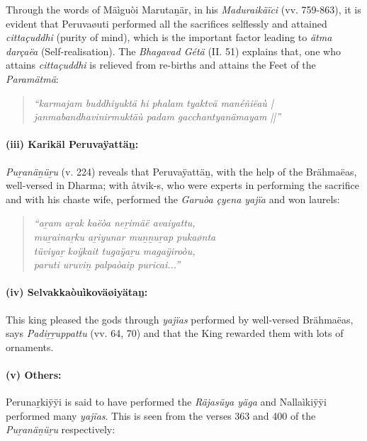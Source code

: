Through the words of Mäìguòi Marutaṉär, in his \textit{Maduraikäïci} (vv. 759-863), it is evident that Peruvaøuti performed all the sacrifices selflessly and attained \textit{cittaçuddhi} (purity of mind), which is the important factor leading to \textit{ätma darçaëa} (Self-realisation). The \textit{Bhagavad Gétä} (II. 51) explains that, one who attains \textit{cittaçuddhi} is relieved from re-births and attains the Feet of the \textit{Paramätmä}:

\begin{verse}
\textit{“karmajam buddhiyuktä hi phalam tyaktvä manéñiëaù |}\\\textit{janmabandhavinirmuktäù padam gacchantyanämayam ||”}
\end{verse}


\paragraph*{(iii) Karikäl Peruvaÿattäṉ:}

\textit{Puṟanäṉüṟu} (v. 224) reveals that Peruvaÿattäṉ, with the help of the Brähmaëas, well-versed in Dharma; with åtvik-s, who were experts in performing the sacrifice and with his chaste wife, performed the \textit{Garuòa çyena yajïa} and won laurels:

\begin{verse}
\textit{“aṟam aṟak kaëòa neṟimäë avaiyattu,}\\\textit{muṟainaṟku aṟiyunar muṉṉuṟap pukaønta}\\\textit{tüviyaṟ koÿkait tugaÿaṟu magaÿiroòu,}\\\textit{paruti uruviṉ palpaòaip puricai...”}
\end{verse}


\paragraph*{(iv) Selvakkaòuìkoväøiyätaṉ:}

This king pleased the gods through \textit{yajïas} performed by well-versed Brähmaëas, says \textit{Padiṟṟuppattu} (vv. 64, 70) and that the King rewarded them with lots of ornaments.


\paragraph*{(v) Others:}

Perunaṟkiÿÿi is said to have performed the \textit{Räjasüya yäga} and Nallaìkiÿÿi performed many \textit{yajïas}. This is seen from the verses 363 and 400 of the \textit{Puṟanäṉüṟu} respectively:

